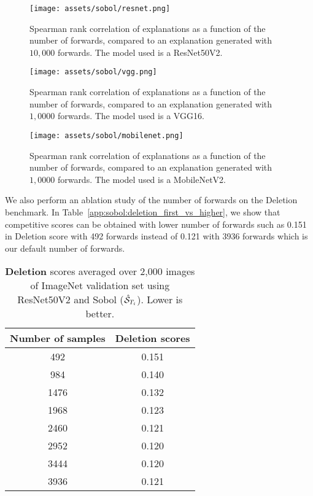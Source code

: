 \begin{figure*}[ht]
    \centering
    \texttt{[image: assets/sobol/resnet.png]}
    \caption{
      Spearman rank correlation of explanations as a function of the number of forwards, compared to an explanation generated with $10,000$ forwards.
      The model used is a ResNet50V2.
    }
    \label{app:sobol:conv:resnet}
\end{figure*}
\begin{figure*}[ht]
    \centering
    \texttt{[image: assets/sobol/vgg.png]}
    \caption{      
    Spearman rank correlation of explanations as a function of the number of forwards, compared to an explanation generated with $1,0000$ forwards.
    The model used is a VGG16.
      }
      \label{app:sobol:conv:vgg}
\end{figure*}
\begin{figure*}[ht]
    \centering
    \texttt{[image: assets/sobol/mobilenet.png]}
    \caption{
      Spearman rank correlation of explanations as a function of the number of forwards, compared to an explanation generated with $1,0000$ forwards.
      The model used is a MobileNetV2.
    }
    \label{app:sobol:conv:mobilenet}
\end{figure*}

We also perform an ablation study of the number of forwards on the Deletion benchmark. In Table~\ref{app:sobol:deletion_first_vs_higher}, we show that competitive scores can be obtained with lower number of forwards such as 0.151 in Deletion score with 492 forwards instead of 0.121 with 3936 forwards which is our default number of forwards.

\begin{table*}[ht]
\centering
\begin{tabular}{cc}
\toprule
Number of samples & Deletion scores \\
\midrule  
492 & 0.151 \\
984 & 0.140 \\
1476 & 0.132 \\
1968 & 0.123 \\
2460 & 0.121 \\
2952 & 0.120 \\
3444 & 0.120 \\
3936 & 0.121 \\
\bottomrule
\end{tabular}
\caption{\textbf{Deletion} scores averaged over 2,000 images of ImageNet validation set using ResNet50V2 and Sobol ($\hat{\mathcal{S}}_{T_i}$). Lower is better. 
}\label{app:sobol:deletion_ablation}
\end{table*}

